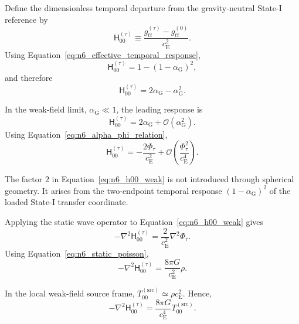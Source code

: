 Define the dimensionless temporal departure from the gravity-neutral State-I reference by
\begin{equation}
    \mathsf{H}_{00}^{(\tau)} \equiv \frac{g_{tt}^{(\tau)} - g_{tt}^{(0)}}{c_{\mathrm{E}}^{2}}.
    \label{eq:n6_h00_definition}
\end{equation}
Using Equation~\eqref{eq:n6_effective_temporal_response},
\begin{equation}
    \mathsf{H}_{00}^{(\tau)} = 1 - \left( 1-\alpha_{\mathrm{G}} \right)^{2},
\end{equation}
and therefore
\begin{equation}
    \mathsf{H}_{00}^{(\tau)} = 2\alpha_{\mathrm{G}} - \alpha_{\mathrm{G}}^{2}.
    \label{eq:n6_h00_exact}
\end{equation}

In the weak-field limit, $\alpha_{\mathrm{G}} \ll 1$, the leading response is
\begin{equation}
    \mathsf{H}_{00}^{(\tau)} = 2\alpha_{\mathrm{G}} + \mathcal{O}\left(\alpha_{\mathrm{G}}^{2}\right).
\end{equation}
Using Equation~\eqref{eq:n6_alpha_phi_relation},
\begin{equation}
    \mathsf{H}_{00}^{(\tau)} = - \frac{2\Phi_{\tau}}{c_{\mathrm{E}}^{2}} + \mathcal{O}\left( \frac{\Phi_{\tau}^{2}}{c_{\mathrm{E}}^{4}} \right).
    \label{eq:n6_h00_weak}
\end{equation}

The factor $2$ in Equation~\eqref{eq:n6_h00_weak} is not introduced through spherical geometry. It arises from the two-endpoint temporal response $( 1-\alpha_{\mathrm{G}} )^{2}$ of the loaded State-I transfer coordinate.

Applying the static wave operator to Equation~\eqref{eq:n6_h00_weak} gives
\begin{equation}
    - \nabla^{2} \mathsf{H}_{00}^{(\tau)} = \frac{2}{c_{\mathrm{E}}^{2}} \nabla^{2}\Phi_{\tau}.
\end{equation}
Using Equation~\eqref{eq:n6_static_poisson},
\begin{equation}
    - \nabla^{2} \mathsf{H}_{00}^{(\tau)} = \frac{8\pi G}{c_{\mathrm{E}}^{2}} \rho.
\end{equation}

In the local weak-field source frame, $T_{00}^{(\mathrm{src})} \simeq \rho c_{\mathrm{E}}^{2}$. Hence,
\begin{equation}
    - \nabla^{2} \mathsf{H}_{00}^{(\tau)} = \frac{8\pi G}{c_{\mathrm{E}}^{4}} T_{00}^{(\mathrm{src})}.
    \label{eq:n6_h00_source_equation}
\end{equation}


